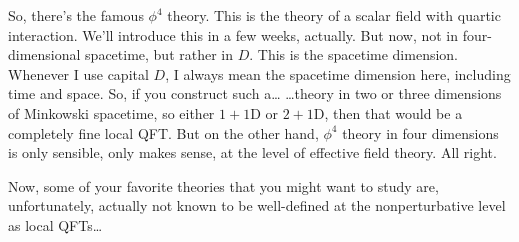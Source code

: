 So, there's the famous $\phi^4$ theory. This is the theory of a scalar field
with quartic interaction. We'll introduce this in a few weeks, actually. But
now, not in four-dimensional spacetime, but rather in $D$. This is the
spacetime dimension. Whenever I use capital $D$, I always mean the spacetime
dimension here, including time and space. So, if you construct such
a\ldots{} \ldots{}theory in two or three dimensions of Minkowski spacetime, so
either $1+1$D or $2+1$D, then that would be a completely fine local QFT. But on
the other hand, $\phi^4$ theory in four dimensions is only sensible, only makes
sense, at the level of effective field theory. All right.


Now, some of your favorite theories that you might want to study are,
unfortunately, actually not known to be well-defined at the nonperturbative
level as local QFTs\ldots{}

